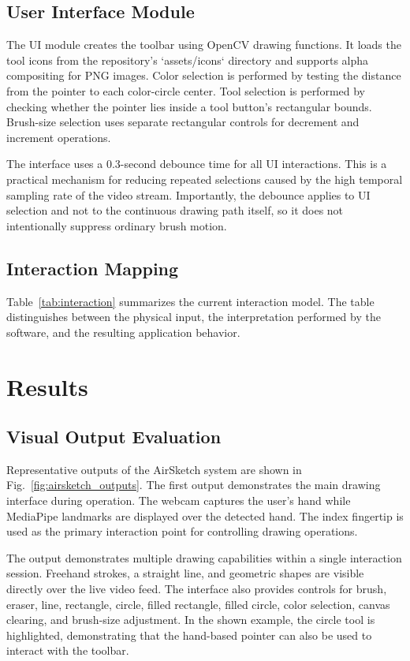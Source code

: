 \documentclass[conference]{IEEEtran}
\begin{document}
\subsection{User Interface Module}
The UI module creates the toolbar using OpenCV drawing functions. It loads the tool icons from the repository's `assets/icons` directory and supports alpha compositing for PNG images. Color selection is performed by testing the distance from the pointer to each color-circle center. Tool selection is performed by checking whether the pointer lies inside a tool button's rectangular bounds. Brush-size selection uses separate rectangular controls for decrement and increment operations.

The interface uses a 0.3-second debounce time for all UI interactions. This is a practical mechanism for reducing repeated selections caused by the high temporal sampling rate of the video stream. Importantly, the debounce applies to UI selection and not to the continuous drawing path itself, so it does not intentionally suppress ordinary brush motion.

\subsection{Interaction Mapping}
Table~\ref{tab:interaction} summarizes the current interaction model. The table distinguishes between the physical input, the interpretation performed by the software, and the resulting application behavior.

\section{Results}

\subsection{Visual Output Evaluation}

Representative outputs of the AirSketch system are shown in Fig.~\ref{fig:airsketch_outputs}. The first output demonstrates the main drawing interface during operation. The webcam captures the user's hand while MediaPipe landmarks are displayed over the detected hand. The index fingertip is used as the primary interaction point for controlling drawing operations.

The output demonstrates multiple drawing capabilities within a single interaction session. Freehand strokes, a straight line, and geometric shapes are visible directly over the live video feed. The interface also provides controls for brush, eraser, line, rectangle, circle, filled rectangle, filled circle, color selection, canvas clearing, and brush-size adjustment. In the shown example, the circle tool is highlighted, demonstrating that the hand-based pointer can also be used to interact with the toolbar.
\end{document}
